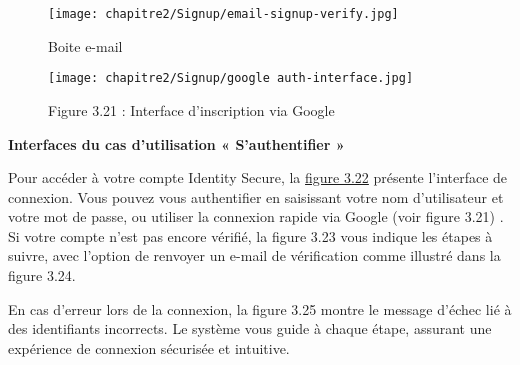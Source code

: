 \begin{figure}[H]
  \centering
  \begin{minipage}[b]{0.9\textwidth}
    \centering
    \texttt{[image: chapitre2/Signup/email-signup-verify.jpg]}
    \caption{Boite e-mail}
  \end{minipage}
\end{figure}

\FloatBarrier
\begin{figure}[H]
  \centering
  \begin{minipage}[b]{0.9\textwidth}
    \centering
    \texttt{[image: chapitre2/Signup/google auth-interface.jpg]}
    \caption{Figure 3.21 : Interface d'inscription via Google}
  \end{minipage}
\end{figure}

\FloatBarrier

\clearpage
\textbf{Interfaces du cas d'utilisation « S'authentifier »}

Pour accéder à votre compte Identity Secure, la \hyperref[fig:3.22]{figure 3.22} présente l'interface de connexion. Vous pouvez vous authentifier en saisissant votre nom d'utilisateur et votre mot de passe, ou utiliser la connexion rapide via Google (voir figure 3.21) . Si votre compte n'est pas encore vérifié, la figure 3.23 vous indique les étapes à suivre, avec l'option de renvoyer un e-mail de vérification comme illustré dans la figure 3.24.

En cas d'erreur lors de la connexion, la figure 3.25 montre le message d'échec lié à des identifiants incorrects. Le système vous guide à chaque étape, assurant une expérience de connexion sécurisée et intuitive.

